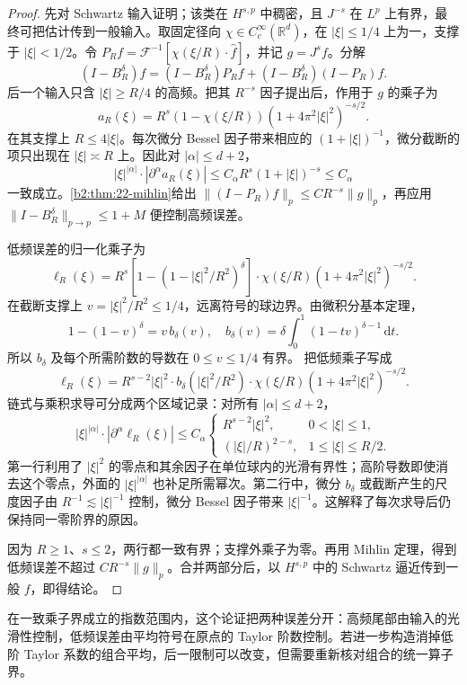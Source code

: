 \begin{proof}
先对 Schwartz 输入证明；该类在 \(H^{s,p}\) 中稠密，且 \(J^{-s}\) 在 \(L^p\) 上有界，最终可把估计传到一般输入。取固定径向
\(\chi\in C_c^\infty(\mathbb R^d)\)，在 \(|\xi|\leq1/4\) 上为一，支撑于 \(|\xi|<1/2\)。令
\(P_Rf=\mathcal F^{-1}[\chi(\xi/R)\cdot\widehat f]\)，并记 \(g=J^sf\)。分解
\[
 (I-B_R^\delta)f
 =(I-B_R^\delta)P_Rf+
 (I-B_R^\delta)(I-P_R)f.
\]
后一个输入只含 \(|\xi|\geq R/4\) 的高频。把其 \(R^{-s}\) 因子提出后，作用于 \(g\) 的乘子为
\[
 a_R(\xi)=R^s(1-\chi(\xi/R))
 (1+4\pi^2|\xi|^2)^{-s/2}.
\]
在其支撑上 \(R\leq4|\xi|\)。每次微分 Bessel 因子带来相应的 \((1+|\xi|)^{-1}\)，微分截断的项只出现在 \(|\xi|\asymp R\) 上。因此对 \(|\alpha|\leq d+2\)，
\[
 |\xi|^{|\alpha|}\cdot|\partial^\alpha a_R(\xi)|
 \leq C_\alpha R^s(1+|\xi|)^{-s}\leq C_\alpha
\]
一致成立。\cref{b2:thm:22-mihlin}给出
\(\|(I-P_R)f\|_p\leq C R^{-s}\|g\|_p\)，再应用
\(\|I-B_R^\delta\|_{p\to p}\leq1+M\)
便控制高频误差。

低频误差的归一化乘子为
\[
 \ell_R(\xi)=R^s[1-(1-|\xi|^2/R^2)^\delta]\cdot
 \chi(\xi/R)(1+4\pi^2|\xi|^2)^{-s/2}.
\]
在截断支撑上 \(v=|\xi|^2/R^2\leq1/4\)，远离符号的球边界。由微积分基本定理，
\[
 1-(1-v)^\delta=v\,b_\delta(v),\quad
 b_\delta(v)=\delta\int_0^1(1-tv)^{\delta-1}\,\mathrm dt.
\]
所以 \(b_\delta\) 及每个所需阶数的导数在 \(0\leq v\leq1/4\) 有界。
把低频乘子写成
\[
 \ell_R(\xi)=R^{s-2}|\xi|^2\cdot
 b_\delta(|\xi|^2/R^2)\cdot\chi(\xi/R)
 (1+4\pi^2|\xi|^2)^{-s/2}.
\]
链式与乘积求导可分成两个区域记录：对所有 \(|\alpha|\leq d+2\)，
\[
 |\xi|^{|\alpha|}\cdot|\partial^\alpha\ell_R(\xi)|
 \leq C_\alpha
 \begin{cases}
 R^{s-2}|\xi|^2,&0<|\xi|\leq1,\\
 (|\xi|/R)^{2-s},&1\leq|\xi|\leq R/2.
 \end{cases}
\]
第一行利用了 \(|\xi|^2\) 的零点和其余因子在单位球内的光滑有界性；高阶导数即使消去这个零点，外面的 \(|\xi|^{|\alpha|}\) 也补足所需幂次。第二行中，微分 \(b_\delta\) 或截断产生的尺度因子由 \(R^{-1}\lesssim|\xi|^{-1}\) 控制，微分 Bessel 因子带来 \(|\xi|^{-1}\)。这解释了每次求导后仍保持同一零阶界的原因。

因为 \(R\geq1\)、\(s\leq2\)，两行都一致有界；支撑外乘子为零。再用 Mihlin 定理，得到低频误差不超过 \(C R^{-s}\|g\|_p\)。合并两部分后，以 \(H^{s,p}\) 中的 Schwartz 逼近传到一般 \(f\)，即得结论。
\end{proof}
在一致乘子界成立的指数范围内，这个论证把两种误差分开：高频尾部由输入的光滑性控制，低频误差由平均符号在原点的 Taylor 阶数控制。若进一步构造消掉低阶 Taylor 系数的组合平均，后一限制可以改变，但需要重新核对组合的统一算子界。

